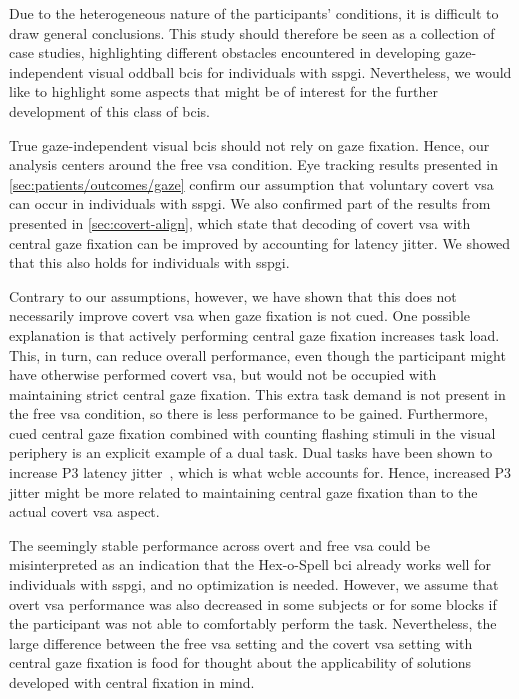 Due to the heterogeneous nature of the participants' conditions, it is difficult to
draw general conclusions.
This study should therefore be seen as a collection of case studies,
highlighting different obstacles encountered in developing gaze-independent
visual oddball \acp{bci} for individuals with \ac{sspgi}.
Nevertheless, we would like to highlight some aspects that might be
of interest for the further development of this class of \acp{bci}.

True gaze-independent visual \acp{bci} should not rely on gaze fixation.
Hence, our analysis centers around the free \ac{vsa} condition.
Eye tracking results presented in \cref{sec:patients/outcomes/gaze}
confirm our assumption that voluntary covert \ac{vsa} can
occur in individuals with \ac{sspgi}.
We also confirmed part of the results from~\textcite{VanDenKerchove2024}
presented in \cref{sec:covert-align}, which state that decoding of covert \ac{vsa} with central gaze
fixation can be improved by accounting for latency jitter. We showed that this
also holds for individuals with \ac{sspgi}.

Contrary to our assumptions, however, we have shown that this does not
necessarily improve covert \ac{vsa} when gaze fixation is not cued.
One possible explanation is that actively performing central gaze fixation
increases task load.
This, in turn, can reduce overall performance, even though the participant might
have otherwise performed covert \ac{vsa}, but would not be occupied with
maintaining strict central gaze fixation.
This extra task demand is not present in the free \ac{vsa} condition, so
there is less performance to be gained.
Furthermore, cued central gaze fixation combined with counting flashing stimuli
in the visual periphery is an explicit example of a dual task.
Dual tasks have been shown to increase P3 latency
jitter~\cite{Polich2007,Arico2014, VanDenKerchove2024},
which is what \ac{wcble} accounts for.
Hence, increased P3 jitter might be more related to maintaining central gaze fixation
than to the actual covert \ac{vsa} aspect.

The seemingly stable performance across overt and free \ac{vsa} could be
misinterpreted as an indication that the Hex-o-Spell \ac{bci} already works
well for individuals with \ac{sspgi}, and no optimization is
needed.
However, we assume that overt \ac{vsa} performance was also decreased in some
subjects or for some blocks if the participant was not able to comfortably
perform the task.
Nevertheless, the large difference between the free \ac{vsa} setting and the
covert \ac{vsa} setting
with central gaze fixation is food for thought about the applicability of
solutions developed with central fixation in mind.

